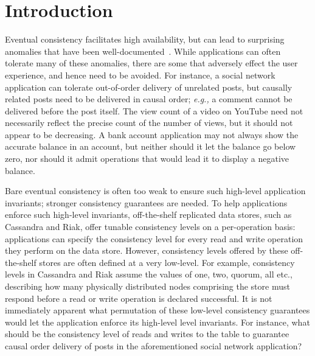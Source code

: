 \section{Introduction}
\label{sec:intro}

Eventual consistency facilitates high availability, but can lead to
surprising anomalies that have been
well-documented~\cite{Burckhardt2014, pldi15, Session, Dynamo,
  RedBlue}. While applications can often tolerate many of these
anomalies, there are some that adversely effect the user experience,
and hence need to be avoided. For instance, a social network
application can tolerate out-of-order delivery of unrelated posts, but
causally related posts need to be delivered in causal order;
\emph{e.g.,} a comment cannot be delivered before the post
itself. The view count of a video on YouTube need not necessarily
reflect the precise count of the number of views, but it should not
appear to be decreasing. A bank account application may not always
show the accurate balance in an account, but neither should it let the
balance go below zero, nor should it admit operations that would
lead it to display a negative balance.

Bare eventual consistency is often too weak to ensure such high-level
application invariants; stronger consistency guarantees are needed. To
help applications enforce such high-level invariants, off-the-shelf
replicated data stores, such as Cassandra and Riak, offer tunable
consistency levels on a per-operation basis: applications can specify
the consistency level for every read and write operation they perform
on the data store. However, consistency levels offered by these
off-the-shelf stores are often defined at a very low-level. For
example, consistency levels in Cassandra and Riak assume the values of
{\sc one}, {\sc two}, {\sc quorum}, {\sc all} etc., describing how many
physically distributed nodes comprising the store must respond before
a read or write operation is declared successful.  It is not
immediately apparent what permutation of these low-level consistency
guarantees would let the application enforce its high-level level
invariants. For instance, what should be the consistency level of
reads and writes to the  table to guarantee causal order
delivery of posts in the aforementioned social network application?

